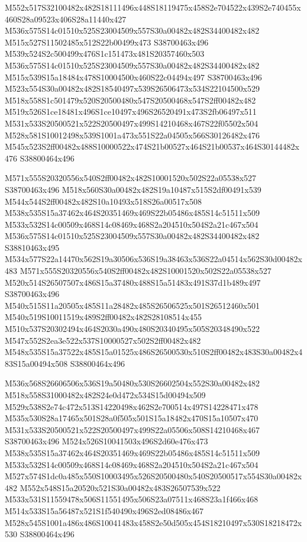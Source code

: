 \documentclass{article}
\begin{document}
\begin{multicols}{2}
M552x517S32100482x482S18111496x448S18119475x458S2e704522x439S2e740455x460S28a09523x406S28a11440x427 M536x575S14c01510x525S23004509x557S30a00482x482S34400482x482 M515x527S11502485x512S22b00499x473 S38700463x496 M539x524S2c500499x476S1c151473x481S20357460x503 M536x575S14c01510x525S23004509x557S30a00482x482S34400482x482 M515x539S15a18484x478S10004500x460S22c04494x497 S38700463x496 M523x554S30a00482x482S18540497x539S26506473x534S22104500x529 M518x558S1c501479x520S20500480x547S20500468x547S2ff00482x482 M519x526S1ce18481x496S1ce10497x496S26520491x473S2fb06497x511 M531x533S20500521x522S20500497x499S14210468x467S22f05502x504 M528x581S10012498x539S1001a473x551S22a04505x566S30126482x476 M545x523S2ff00482x488S10000522x474S21b00527x464S21b00537x464S30144482x476 S38800464x496

M571x555S20320556x540S2ff00482x482S10001520x502S22a05538x527 S38700463x496 M518x560S30a00482x482S19a10487x515S2df00491x539 M544x544S2ff00482x482S10a10493x518S26a00517x508 M538x535S15a37462x464S20351469x469S22b05486x485S14c51511x509 M533x532S14c00509x468S14c08469x468S2a204510x504S2a21c467x504 M536x575S14c01510x525S23004509x557S30a00482x482S34400482x482 S38810463x495 M534x577S22a14470x562S19a30506x536S19a38463x536S22a04514x562S30d00482x483 M571x555S20320556x540S2ff00482x482S10001520x502S22a05538x527 M520x514S26507507x486S15a37480x488S15a51483x491S37d1b489x497 S38700463x496 M540x515S11a20505x485S11a28482x485S26506525x501S26512460x501 M540x519S10011519x489S2ff00482x482S28108514x455 M510x537S20302494x464S2030a490x480S20340495x505S20348490x522 M547x552S2ea3e522x537S10000527x502S2ff00482x482 M548x535S15a37522x485S15a01525x486S26500530x510S2ff00482x483S30a00482x483S15a00494x508 S38800464x496

M536x568S26606506x536S19a50480x530S26602504x552S30a00482x482 M518x558S31000482x482S24e0d472x534S15d00494x509 M529x538S2e74c472x513S14220498x462S2e700514x497S14228471x478 M535x530S28a17465x501S28a0f505x501S15a18482x470S15a10507x470 M531x533S20500521x522S20500497x499S22a05506x508S14210468x467 S38700463x496 M524x526S10041503x496S2d60e476x473 M538x535S15a37462x464S20351469x469S22b05486x485S14c51511x509 M533x532S14c00509x468S14c08469x468S2a204510x504S2a21c467x504 M527x574S1dc0a485x550S10003495x526S20500480x540S20500517x554S30a00482x482 M552x548S15a20520x521S30a00482x483S26507539x522 M533x531S11559478x506S11551495x506S23a07511x468S23a1f466x468 M514x533S15a56487x521S1f540490x496S2ed08486x467 M528x545S1001a486x486S10041483x458S2e50d505x454S18210497x530S18218472x530 S38800464x496


\end{multicols}
\end{document}
